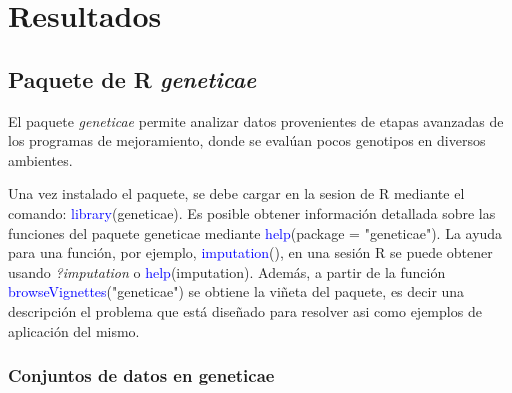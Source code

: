 \chapter{Resultados}

\section{Paquete de R \emph{geneticae}}

El paquete \emph{geneticae} permite analizar datos provenientes de etapas avanzadas de los programas de mejoramiento, donde se evalúan pocos genotipos en diversos ambientes. 

Una vez instalado el paquete, se debe cargar en la sesion de R mediante el comando: \textcolor{blue}{library}(geneticae). Es posible obtener información detallada sobre las funciones del paquete geneticae mediante \textcolor{blue}{help}(package = "geneticae"). La ayuda para una función, por ejemplo, \textcolor{blue}{imputation}(), en una sesión R se puede obtener usando \emph{?imputation} o \textcolor{blue}{help}(imputation). Además, a partir de la función \textcolor{blue}{browseVignettes}("geneticae") se obtiene la viñeta del paquete, es decir una descripción el problema que está diseñado para resolver asi como ejemplos de aplicación del mismo.

\subsection{Conjuntos de datos en geneticae}

